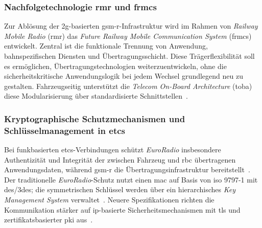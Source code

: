 \documentclass[runningheads]{res/llncs}
\begin{document}
\subsubsection{\texorpdfstring{Nachfolgetechnologie \gls{rmr} und \gls{frmcs}}{Nachfolgetechnologie RMR und FRMCS}}
\label{sec:Nachfolgetechnologie_RMR_und_FRMCS}
Zur Ablösung der \gls{2g}-basierten \gls{gsm-r}-Infrastruktur wird im Rahmen von \textit{Railway Mobile Radio} (\gls{rmr}) das \textit{Future Railway Mobile Communication System} (\gls{frmcs}) entwickelt.
Zentral ist die funktionale Trennung von Anwendung, bahnspezifischen Diensten und Übertragungsschicht. Diese Trägerflexibilität soll es ermöglichen, Übertragungstechnologien weiterzuentwickeln, ohne die sicherheitskritische Anwendungslogik bei jedem Wechsel grundlegend neu zu gestalten.
Fahrzeugseitig unterstützt die \textit{Telecom On-Board Architecture} (\gls{toba}) diese Modularisierung über standardisierte Schnittstellen~\parencite[S. 125--137]{trinckaufETCS2024}.

\subsubsection{\texorpdfstring{Kryptographische Schutzmechanismen und Schlüsselmanagement in \gls{etcs}}{Kryptographische Schutzmechanismen und Schlüsselmanagement in ETCS}}
\label{sec:Kryptographische_Schutzmechanismen_und_Schlüsselmanagement_in_ETCS}
Bei funkbasierten \gls{etcs}-Verbindungen schützt \textit{EuroRadio} insbesondere Authentizität und Integrität der zwischen Fahrzeug und \gls{rbc} übertragenen Anwendungsdaten, während \gls{gsm-r} die Übertragungsinfrastruktur bereitstellt~\cite{chothiaAttack2017}. Der traditionelle \textit{EuroRadio}-Schutz nutzt einen \gls{mac} auf Basis von \gls{iso} 9797-1 mit \gls{des}/\gls{3des}; die symmetrischen Schlüssel werden über ein hierarchisches \textit{Key Management System} verwaltet~\cite{chothiaAttack2017}. Neuere Spezifikationen richten die Kommunikation stärker auf \gls{ip}-basierte Sicherheitsmechanismen mit \gls{tls} und zertifikatsbasierter \gls{pki} aus~\parencite[S. 210--212]{trinckaufETCS2024}.
\end{document}
